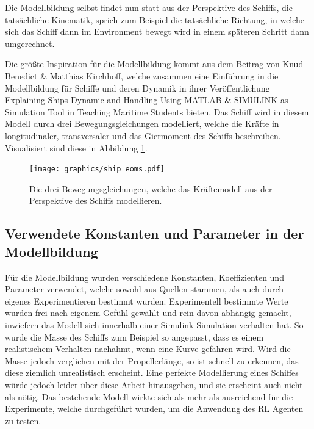 \documentclass[]{iat}
\begin{document}
Die Modellbildung selbst findet nun statt aus der Perspektive des Schiffs, die tatsächliche Kinematik, sprich zum Beispiel die tatsächliche Richtung, in welche sich das Schiff dann im Environment bewegt wird in einem späteren Schritt dann umgerechnet.

Die größte Inspiration für die Modellbildung kommt aus dem Beitrag von Knud Benedict \& Matthias Kirchhoff, welche zusammen eine Einführung in die Modellbildung für Schiffe und deren Dynamik in ihrer Veröffentlichung \glqq Explaining Ships Dynamic and Handling Using MATLAB \& SIMULINK as Simulation Tool in Teaching Maritime Students\grqq{} \cite[]{Benedict2007ExplainingSD} bieten. Das Schiff wird in diesem Modell durch drei Bewegungsgleichungen modelliert, welche die Kräfte in longitudinaler, transversaler und das Giermoment des Schiffs beschreiben. Visualisiert sind diese in Abbildung \ref{abb:ship_eoms}.
\begin{figure}[H]
    \texttt{[image: graphics/ship\_eoms.pdf]}
    \centering
    \caption{Die drei Bewegungsgleichungen, welche das Kräftemodell aus der Perspektive des Schiffs modellieren.}
    \label{abb:ship_eoms}
\end{figure}

\subsection{Verwendete Konstanten und Parameter in der Modellbildung}
Für die Modellbildung wurden verschiedene Konstanten, Koeffizienten und Parameter verwendet, welche sowohl aus Quellen stammen, als auch durch eigenes Experimentieren bestimmt wurden. Experimentell bestimmte Werte wurden frei nach eigenem Gefühl gewählt und rein davon abhängig gemacht, inwiefern das Modell sich innerhalb einer Simulink Simulation verhalten hat. So wurde die Masse des Schiffs zum Beispiel so angepasst, dass es einem \glqq realistischem\grqq{} Verhalten nachahmt, wenn eine Kurve gefahren wird. Wird die Masse jedoch verglichen mit der Propellerlänge, so ist schnell zu erkennen, das diese ziemlich unrealistisch erscheint. Eine perfekte Modellierung eines Schiffes würde jedoch leider über diese Arbeit hinausgehen, und sie erscheint auch nicht als nötig. Das bestehende Modell wirkte sich als mehr als ausreichend für die Experimente, welche durchgeführt wurden, um die Anwendung des RL Agenten zu testen.
\end{document}
